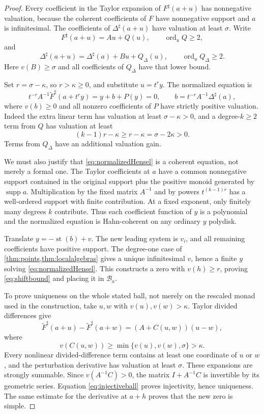 \documentclass[11pt,letterpaper]{article}
\theoremstyle{definition}
\theoremstyle{remark}
\newcommand{\sh}{^{\sharp}}
\newcommand{\supp}{\operatorname{supp}}
\newcommand{\st}{\operatorname{st}}
\newcommand{\ord}{\operatorname{ord}}
\numberwithin{equation}{section}
\begin{document}
\begin{proof}
Every coefficient in the Taylor expansion of $F\sh(a+u)$ has nonnegative valuation, because the coherent coefficients of $F$ have nonnegative support and $a$ is infinitesimal. The coefficients of $\Delta\sh(a+u)$ have valuation at least $\sigma$. Write
\[
 F\sh(a+u)=Au+Q(u),\qquad \ord_u Q\ge2,
\]
and
\[
 \Delta\sh(a+u)=\Delta\sh(a)+B u+Q_\Delta(u),\qquad
 \ord_u Q_\Delta\ge2.
\]
Here $v(B)\ge\sigma$ and all coefficients of $Q_\Delta$ have that lower bound.

Set $r=\sigma-\kappa$, so $r>\kappa\ge0$, and substitute $u=t^r y$. The normalized equation is
\begin{equation}\label{eq:normalizedHensel}
 t^{-r}A^{-1}\widetilde F\sh(a+t^ry)
 =y+b+P(y)=0,\qquad b=t^{-r}A^{-1}\Delta\sh(a),
\end{equation}
where $v(b)\ge0$ and all nonzero coefficients of $P$ have strictly positive valuation. Indeed the extra linear term has valuation at least $\sigma-\kappa>0$, and a degree-$k\ge2$ term from $Q$ has valuation at least
\[
 (k-1)r-\kappa\ge r-\kappa=\sigma-2\kappa>0.
\]
Terms from $Q_\Delta$ have an additional valuation gain.

We must also justify that \eqref{eq:normalizedHensel} is a coherent equation, not merely a formal one. The Taylor coefficients at $a$ have a common nonnegative support contained in the original support plus the positive monoid generated by $\supp a$. Multiplication by the fixed matrix $A^{-1}$ and by powers $t^{(k-1)r}$ has a well-ordered support with finite contribution. At a fixed exponent, only finitely many degrees $k$ contribute. Thus each coefficient function of $y$ is a polynomial and the normalized equation is Hahn-coherent on any ordinary $y$ polydisk.

Translate $y=-\st(b)+v$. The new leading system is $v_i$, and all remaining coefficients have positive support. The degree-one case of \cref{thm:points,thm:localalgebras} gives a unique infinitesimal $v$, hence a finite $y$ solving \eqref{eq:normalizedHensel}. This constructs a zero with $v(h)\ge r$, proving \eqref{eq:shiftbound} and placing it in $\mathcal B_a$.

To prove uniqueness on the whole stated ball, not merely on the rescaled monad used in the construction, take $u,w$ with $v(u),v(w)>\kappa$. Taylor divided differences give
\begin{equation}\label{eq:injectiveball}
 \widetilde F\sh(a+u)-\widetilde F\sh(a+w)
 =(A+C(u,w))(u-w),
\end{equation}
where
\[
 v(C(u,w))\ge\min\{v(u),v(w),\sigma\}>\kappa.
\]
Every nonlinear divided-difference term contains at least one coordinate of $u$ or $w$, and the perturbation derivative has valuation at least $\sigma$. These expansions are strongly summable. Since $v(A^{-1}C)>0$, the matrix $I+A^{-1}C$ is invertible by its geometric series. Equation \eqref{eq:injectiveball} proves injectivity, hence uniqueness. The same estimate for the derivative at $a+h$ proves that the new zero is simple.


\end{proof}
\end{document}

